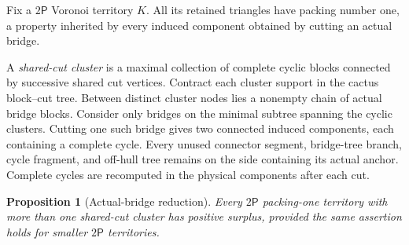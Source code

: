 \documentclass[11pt]{article}
\newtheorem{proposition}[theorem]{Proposition}
\theoremstyle{remark}
\newcommand{\Pp}{\mathsf P}
\begin{document}
Fix a $2\Pp$ Voronoi territory $K$.  All its retained triangles have packing
number one, a property inherited by every induced component obtained by
cutting an actual bridge.

A \emph{shared-cut cluster} is a maximal collection of complete cyclic blocks
connected by successive shared cut vertices.  Contract each cluster support
in the cactus block--cut tree.  Between distinct cluster nodes lies a nonempty
chain of actual bridge blocks.  Consider only bridges on the minimal subtree
spanning the cyclic clusters.  Cutting one such bridge gives two connected
induced components, each containing a complete cycle.  Every unused connector
segment, bridge-tree branch, cycle fragment, and off-hull tree remains on the
side containing its actual anchor.  Complete cycles are recomputed in the
physical components after each cut.

\begin{proposition}[Actual-bridge reduction]\label{prop:bridge}
Every $2\Pp$ packing-one territory with more than one shared-cut cluster has
positive surplus, provided the same assertion holds for smaller $2\Pp$
territories.
\end{proposition}
\end{document}
